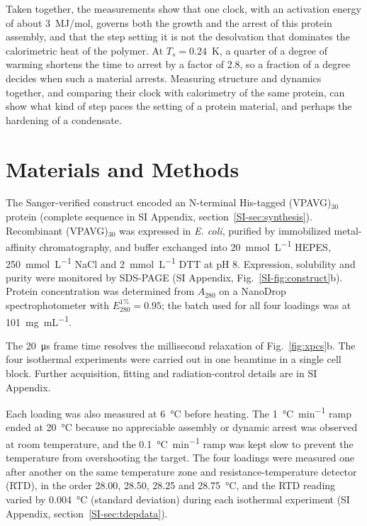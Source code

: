 \documentclass[journal=nalefd,manuscript=letter,layout=traditional]{achemso}
\newcommand{\VPAVG}{(VPAVG)$_{30}$}
\begin{document}
Taken together, the measurements show that one clock, with an activation energy of about 3~MJ/mol, governs both the growth and the arrest of this protein assembly, and that the step setting it is not the desolvation that dominates the calorimetric heat of the polymer. At $T_s=0.24$~K, a quarter of a degree of warming shortens the time to arrest by a factor of 2.8, so a fraction of a degree decides when such a material arrests. Measuring structure and dynamics together, and comparing their clock with calorimetry of the same protein, can show what kind of step paces the setting of a protein material, and perhaps the hardening of a condensate.

\section*{Materials and Methods}
The Sanger-verified construct encoded an N-terminal His-tagged \VPAVG{} protein (complete sequence in SI Appendix, section~\ref*{SI-sec:synthesis}). Recombinant \VPAVG{} was expressed in \textit{E. coli}, purified by immobilized metal-affinity chromatography, and buffer exchanged into \SI{20}{\milli\mole\per\liter} HEPES, \SI{250}{\milli\mole\per\liter} NaCl and \SI{2}{\milli\mole\per\liter} DTT at pH 8. Expression, solubility and purity were monitored by SDS-PAGE (SI Appendix, Fig.~\ref*{SI-fig:construct}b). Protein concentration was determined from $A_{280}$ on a NanoDrop spectrophotometer with $E^{1\%}_{280}=0.95$; the batch used for all four loadings was at \SI{101}{\milli\gram\per\milli\liter}.

The \SI{20}{\micro\second} frame time resolves the millisecond relaxation of Fig.~\ref{fig:xpcs}b. The four isothermal experiments were carried out in one beamtime in a single cell block. Further acquisition, fitting and radiation-control details are in SI Appendix.

Each loading was also measured at \SI{6}{\degreeCelsius} before heating. The \SI{1}{\degreeCelsius\per\minute} ramp ended at \SI{20}{\degreeCelsius} because no appreciable assembly or dynamic arrest was observed at room temperature, and the \SI{0.1}{\degreeCelsius\per\minute} ramp was kept slow to prevent the temperature from overshooting the target. The four loadings were measured one after another on the same temperature zone and resistance-temperature detector (RTD), in the order 28.00, 28.50, 28.25 and \SI{28.75}{\degreeCelsius}, and the RTD reading varied by \SI{0.004}{\degreeCelsius} (standard deviation) during each isothermal experiment (SI Appendix, section~\ref*{SI-sec:tdepdata}).
\end{document}
